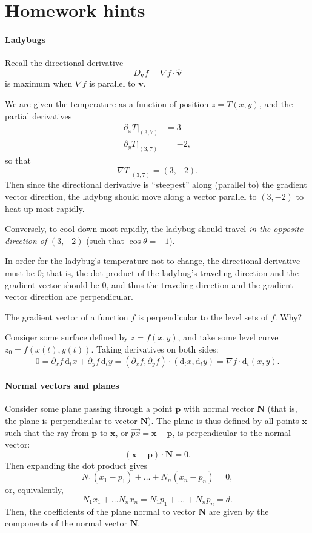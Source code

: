 \documentclass[11pt]{article}
\newcommand{\uvec}[1]{\mathbf{\hat{#1}}}
\renewcommand{\vec}[1]{\mathbf{#1}}
\begin{document}
\section*{Homework hints}


\paragraph{Ladybugs}


Recall the directional derivative
\[
    D_{\vec v} f = \nabla f \cdot \uvec v
\]
is maximum when \(\nabla f\) is parallel to \(\vec v\).

We are given the temperature as a function of position \(z = T(x, y)\), and the partial derivatives
\begin{align*}
    \partial_x T \big|_{(3, 7)} &= 3 \\
    \partial_y T \big|_{(3, 7)} &= -2,
\end{align*}
so that
\[
    \nabla T \big|_{(3, 7)} = (3, -2).
\]
Then since the directional derivative is ``steepest'' along (parallel to) the gradient vector direction, the ladybug should move along a vector parallel to \((3, -2)\) to heat up most rapidly.

Conversely, to cool down most rapidly, the ladybug should travel \emph{in the opposite direction of} \((3, -2)\) (such that \(\cos\theta = -1\)).

In order for the ladybug's temperature not to change, the directional derivative must be \(0\); that is, the dot product of the ladybug's traveling direction and the gradient vector should be \(0\), and thus the traveling direction and the gradient vector direction are perpendicular.

The gradient vector of a function \(f\) is perpendicular to the level sets of \(f\). Why?

Consiqer some surface defined by \(z = f(x, y)\), and take some level curve \(z_0 = f(x(t), y(t))\). Taking derivatives on both sides:
\[
    0 = \partial_x f \, \mathrm d_t x + \partial_y f \, \mathrm d_t y = (\partial_x f, \partial_y f) \cdot (\mathrm d_t x, \mathrm d_t y) = \nabla f \cdot \mathrm d_t (x, y).
\]

\paragraph{Normal vectors and planes}

Consider some plane passing through a point \(\vec p\) with normal vector \(\vec N\) (that is, the plane is perpendicular to vector \(\vec N\)). The plane is thus defined by all points \(\vec x\) such that the ray from \(\vec p\) to \(\vec x\), or \(\overrightarrow{px} = \vec x - \vec p\), is perpendicular to the normal vector:
\[
    (\vec x - \vec p) \cdot \vec N = 0.
\]
Then expanding the dot product gives
\[
    N_1 (x_1 - p_1) + \dots + N_n (x_n - p_n) = 0,
\]
or, equivalently,
\[
    N_1 x_1 + \dots N_n x_n = N_1 p_1 + \dots + N_n p_n = d.
\]
Then, the coefficients of the plane normal to vector \(\vec N\) are given by the components of the normal vector \(\vec N\). 
\end{document}
